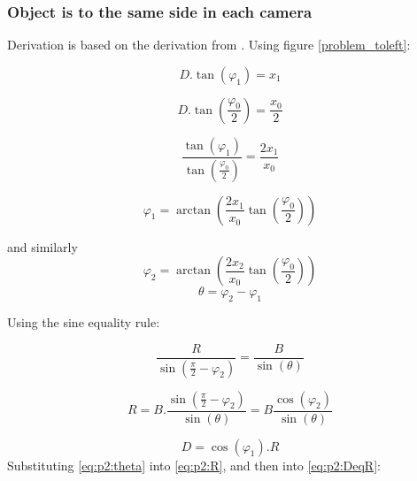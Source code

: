 \subsubsection{Object is to the same side in each camera}
Derivation is based on the derivation from \cite{DistanceEstimation}. Using figure \ref{problem_toleft}:

\begin{equation} \label{eq:p2:tanphi1}
D.\tan(\varphi_{1}) = x_{1}
\end{equation}

\begin{equation} \label{eq:p2:tanphi0}
D.\tan\left(\frac{\varphi_{0}}{2}\right) = \frac{x_{0}}{2}
\end{equation}

\begin{equation} \label{eq:p2:tanphi0and1}
\frac{\tan(\varphi_{1})}{\tan(\frac{\varphi_0}{2})} = \frac{2x_1}{x_0}
\end{equation}

\begin{equation} \label{eq:p2:phi1}
\varphi_1 = \arctan\left(\frac{2x_1}{x_0}\tan\left(\frac{\varphi_0}{2}\right)\right)
\end{equation}

and similarly
\begin{equation} \label{eq:p2:phi2}
\varphi_2 = \arctan\left(\frac{2x_2}{x_0}\tan\left(\frac{\varphi_0}{2}\right)\right)
\end{equation}
\begin{equation} \label{eq:p2:theta}
\theta = \varphi_2 - \varphi_1
\end{equation}

Using the sine equality rule:

\begin{equation} \label{eq:p2:sineeq}
\frac{R}{\sin(\frac{\pi}{2} - \varphi_2)} = \frac{B}{\sin(\theta)}
\end{equation}

\begin{equation} \label{eq:p2:R}
R = B.\frac{\sin(\frac{\pi}{2} - \varphi_2)}{\sin(\theta)} = B \frac{\cos(\varphi_2)}{\sin(\theta)}
\end{equation}

\begin{equation} \label{eq:p2:DeqR}
D = \cos(\varphi_1).R
\end{equation}
Substituting \eqref{eq:p2:theta} into \eqref{eq:p2:R}, and then into \eqref{eq:p2:DeqR}:

